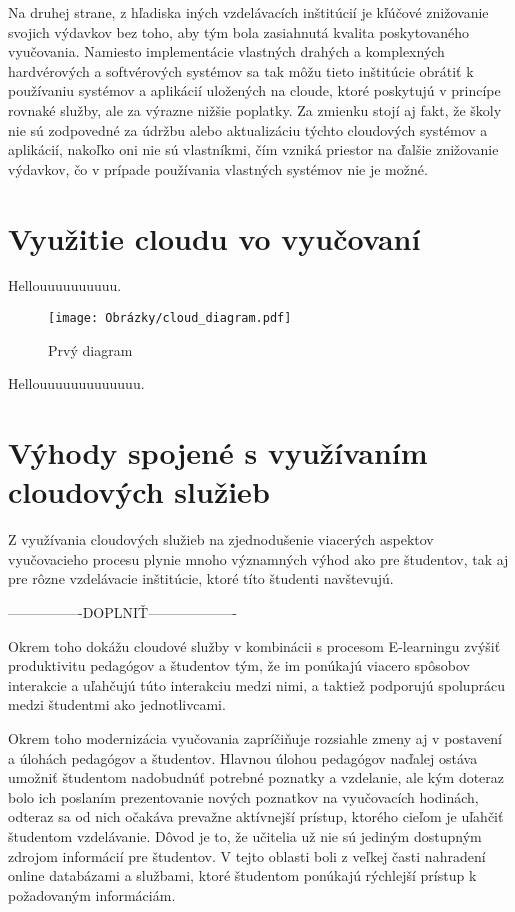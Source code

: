 \documentclass[10pt,slovak,a4paper]{article}%
\begin{document}
Na druhej strane, z hľadiska iných vzdelávacích inštitúcií je kľúčové znižovanie svojich výdavkov bez toho, aby tým bola zasiahnutá kvalita poskytovaného vyučovania. Namiesto implementácie vlastných drahých a komplexných hardvérových a softvérových systémov sa tak môžu tieto inštitúcie obrátiť k používaniu systémov a aplikácií uložených na cloude, ktoré poskytujú v princípe rovnaké služby, ale za výrazne nižšie poplatky\cite{Mhouti_benefits_challenges}. Za zmienku stojí aj fakt, že školy nie sú zodpovedné za údržbu alebo aktualizáciu týchto cloudových systémov a aplikácií, nakoľko oni nie sú vlastníkmi, čím vzniká priestor na ďalšie znižovanie výdavkov\cite{Narkar_cloud-basededucation}, čo v prípade používania vlastných systémov nie je možné. 


\section{Využitie cloudu vo vyučovaní}

Hellouuuuuuuuuu.

\begin{figure}[h]
\texttt{[image: Obrázky/cloud\_diagram.pdf]}
\caption{Prvý diagram}
\end{figure}

Hellouuuuuuuuuuuuu.


\section{Výhody spojené s využívaním cloudových služieb}


Z využívania cloudových služieb na zjednodušenie viacerých aspektov vyučovacieho procesu plynie mnoho významných výhod ako pre študentov, tak aj pre rôzne vzdelávacie inštitúcie, ktoré títo študenti navštevujú.

----------------DOPLNIŤ-------------------

Okrem toho dokážu cloudové služby v kombinácii s procesom E-learningu zvýšiť produktivitu pedagógov a študentov tým, že im ponúkajú viacero spôsobov interakcie a uľahčujú túto interakciu medzi nimi, a taktiež podporujú spoluprácu medzi študentmi ako jednotlivcami\cite{Mhouti_benefits_challenges}.

Okrem toho modernizácia vyučovania zapríčiňuje rozsiahle zmeny aj v postavení a úlohách pedagógov a študentov\cite{Koutsopoulos_schooloncloud}. Hlavnou úlohou pedagógov naďalej ostáva umožniť študentom nadobudnúť potrebné poznatky a vzdelanie, ale kým doteraz bolo ich poslaním prezentovanie nových poznatkov na vyučovacích hodinách, odteraz sa od nich očakáva prevažne aktívnejší prístup, ktorého cieľom je uľahčiť študentom vzdelávanie\cite{Koutsopoulos_schooloncloud}. Dôvod je to, že učitelia už nie sú jediným dostupným zdrojom informácií pre študentov. V tejto oblasti boli z veľkej časti nahradení online databázami a službami, ktoré študentom ponúkajú rýchlejší prístup k požadovaným informáciám.
\end{document}
